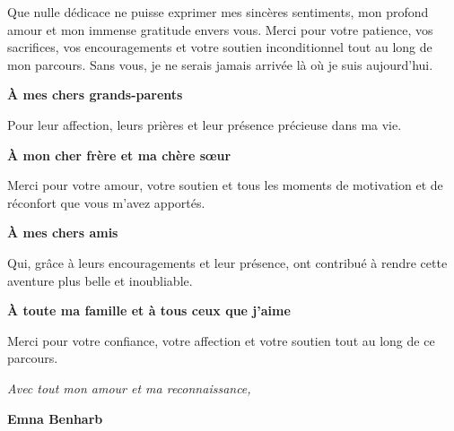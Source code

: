 Que nulle dédicace ne puisse exprimer mes sincères sentiments, mon profond amour et mon immense gratitude envers vous.  
Merci pour votre patience, vos sacrifices, vos encouragements et votre soutien inconditionnel tout au long de mon parcours.  
Sans vous, je ne serais jamais arrivée là où je suis aujourd’hui.

\vspace{0.7cm}

\begin{center}
	\textbf{\Large À mes chers grands-parents}
\end{center}

Pour leur affection, leurs prières et leur présence précieuse dans ma vie.

\vspace{0.7cm}

\begin{center}
	\textbf{\Large À mon cher frère et ma chère sœur}
\end{center}

Merci pour votre amour, votre soutien et tous les moments de motivation et de réconfort que vous m’avez apportés.

\vspace{0.7cm}

\begin{center}
	\textbf{\Large À mes chers amis}
\end{center}

Qui, grâce à leurs encouragements et leur présence, ont contribué à rendre cette aventure plus belle et inoubliable.

\vspace{0.7cm}

\begin{center}
	\textbf{\Large À toute ma famille et à tous ceux que j’aime}
\end{center}

Merci pour votre confiance, votre affection et votre soutien tout au long de ce parcours.

\vfill

\begin{flushright}
	\textit{Avec tout mon amour et ma reconnaissance,}
	
	\vspace{0.3cm}
	
	\textbf{Emna Benharb}
\end{flushright}